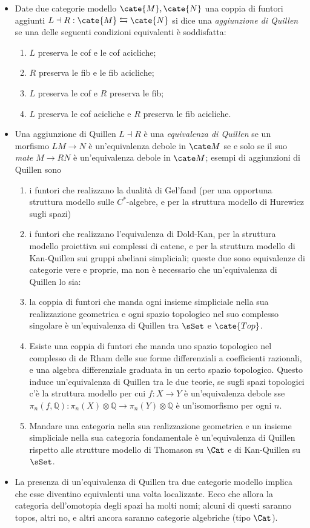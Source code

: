 \documentclass[10pt,a4paper]{amsart}
\begin{document}
\begin{itemize}
\item Date due categorie modello $\cate{M}, \cate{N}$ una coppia di funtori aggiunti $L\dashv R : \cate{M}\leftrightarrows \cate{N}$ si dice una \emph{aggiunzione di Quillen} se una delle seguenti condizioni equivalenti è soddisfatta:
\begin{enumerate}
\item $L$ preserva le cof e le cof acicliche;
\item $R$ preserva le fib e le fib acicliche;
\item $L$ preserva le cof e $R$ preserva le fib;
\item $L$ preserva le cof acicliche e $R$ preserva le fib acicliche.
\end{enumerate}
\item Una aggiunzione di Quillen $L\dashv R$ è una \emph{equivalenza di Quillen} se un morfismo $LM\to N$ è un'equivalenza debole in $\cate M$ se e solo se il suo \emph{mate} $M \to RN$ è un'equivalenza debole in $\cate M$; esempi di aggiunzioni di Quillen sono
\begin{enumerate}
\item i funtori che realizzano la dualità di Gel'fand (per una opportuna struttura modello sulle $C^*$-algebre, e per la struttura modello di Hurewicz sugli spazi)
\item i funtori che realizzano l'equivalenza di Dold-Kan, per la struttura modello proiettiva sui complessi di catene, e per la struttura modello di Kan-Quillen sui gruppi abeliani simpliciali; queste due sono equivalenze di categorie vere e proprie, ma non è necessario che un'equivalenza di Quillen lo sia:
\item la coppia di funtori che manda ogni insieme simpliciale nella sua realizzazione geometrica e ogni spazio topologico nel suo complesso singolare è un'equivalenza di Quillen tra $\sSet$ e $\cate{Top}$.
\item Esiste una coppia di funtori che manda uno spazio topologico nel complesso di de Rham delle sue forme differenziali a coefficienti razionali, e una algebra differenziale graduata in un certo spazio topologico. Questo induce un'equivalenza di Quillen tra le due teorie, se sugli spazi topologici c'è la struttura modello per cui $f : X \to Y$ è un'equivalenza debole sse $\pi_n(f, \mathbb{Q}) : \pi_n(X)\otimes\mathbb{Q}\to \pi_n(Y)\otimes\mathbb{Q}$ è un'isomorfismo per ogni $n$.
\item Mandare una categoria nella sua realizzazione geometrica e un insieme simpliciale nella sua categoria fondamentale è un'equivalenza di Quillen rispetto alle strutture modello di Thomason su $\Cat$ e di Kan-Quillen su $\sSet$.
\end{enumerate}
\item La presenza di un'equivalenza di Quillen tra due categorie modello implica che esse diventino equivalenti una volta localizzate. Ecco che allora la categoria dell'omotopia degli spazi ha molti nomi; alcuni di questi saranno topos, altri no, e altri ancora saranno categorie algebriche (tipo $\Cat$).
\end{itemize}
\end{document}

